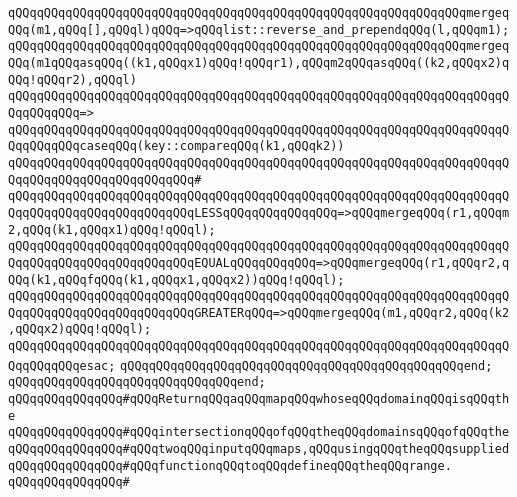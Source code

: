 \verb|qQQqqQQqqQQqqQQqqQQqqQQqqQQqqQQqqQQqqQQqqQQqqQQqqQQqqQQqqQQqqQQqmergeqQQq(m1,qQQq[],qQQql)qQQq=>qQQqlist::reverse_and_prependqQQq(l,qQQqm1);|\newline
\newline
\verb|qQQqqQQqqQQqqQQqqQQqqQQqqQQqqQQqqQQqqQQqqQQqqQQqqQQqqQQqqQQqqQQqmergeqQQq(m1qQQqasqQQq((k1,qQQqx1)qQQq!qQQqr1),qQQqm2qQQqasqQQq((k2,qQQqx2)qQQq!qQQqr2),qQQql)|\newline
\verb|qQQqqQQqqQQqqQQqqQQqqQQqqQQqqQQqqQQqqQQqqQQqqQQqqQQqqQQqqQQqqQQqqQQqqQQqqQQqqQQq=>|\newline
\verb|qQQqqQQqqQQqqQQqqQQqqQQqqQQqqQQqqQQqqQQqqQQqqQQqqQQqqQQqqQQqqQQqqQQqqQQqqQQqqQQqcaseqQQq(key::compareqQQq(k1,qQQqk2))|\newline
\verb|qQQqqQQqqQQqqQQqqQQqqQQqqQQqqQQqqQQqqQQqqQQqqQQqqQQqqQQqqQQqqQQqqQQqqQQqqQQqqQQqqQQqqQQqqQQqqQQq#|\newline
\verb|qQQqqQQqqQQqqQQqqQQqqQQqqQQqqQQqqQQqqQQqqQQqqQQqqQQqqQQqqQQqqQQqqQQqqQQqqQQqqQQqqQQqqQQqqQQqqQQqLESSqQQqqQQqqQQqqQQq=>qQQqmergeqQQq(r1,qQQqm2,qQQq(k1,qQQqx1)qQQq!qQQql);|\newline
\verb|qQQqqQQqqQQqqQQqqQQqqQQqqQQqqQQqqQQqqQQqqQQqqQQqqQQqqQQqqQQqqQQqqQQqqQQqqQQqqQQqqQQqqQQqqQQqqQQqEQUALqQQqqQQqqQQq=>qQQqmergeqQQq(r1,qQQqr2,qQQq(k1,qQQqfqQQq(k1,qQQqx1,qQQqx2))qQQq!qQQql);|\newline
\verb|qQQqqQQqqQQqqQQqqQQqqQQqqQQqqQQqqQQqqQQqqQQqqQQqqQQqqQQqqQQqqQQqqQQqqQQqqQQqqQQqqQQqqQQqqQQqqQQqGREATERqQQq=>qQQqmergeqQQq(m1,qQQqr2,qQQq(k2,qQQqx2)qQQq!qQQql);|\newline
\verb|qQQqqQQqqQQqqQQqqQQqqQQqqQQqqQQqqQQqqQQqqQQqqQQqqQQqqQQqqQQqqQQqqQQqqQQqqQQqqQQqesac;|\newline
\verb|qQQqqQQqqQQqqQQqqQQqqQQqqQQqqQQqqQQqqQQqqQQqqQQqend;|\newline
\verb|qQQqqQQqqQQqqQQqqQQqqQQqqQQqqQQqend;|\newline
\newline
\newline
\verb|qQQqqQQqqQQqqQQq#qQQqReturnqQQqaqQQqmapqQQqwhoseqQQqdomainqQQqisqQQqthe|\newline
\verb|qQQqqQQqqQQqqQQq#qQQqintersectionqQQqofqQQqtheqQQqdomainsqQQqofqQQqthe|\newline
\verb|qQQqqQQqqQQqqQQq#qQQqtwoqQQqinputqQQqmaps,qQQqusingqQQqtheqQQqsupplied|\newline
\verb|qQQqqQQqqQQqqQQq#qQQqfunctionqQQqtoqQQqdefineqQQqtheqQQqrange.|\newline
\verb|qQQqqQQqqQQqqQQq#|\newline
